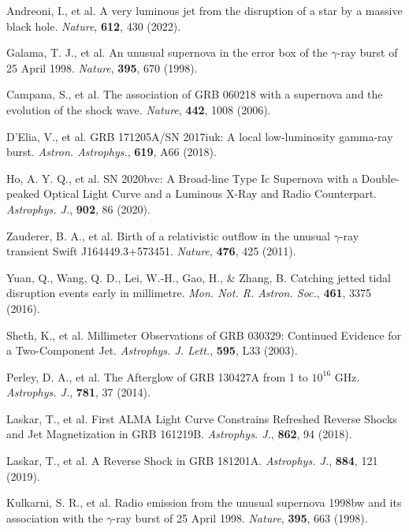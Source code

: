 \documentclass{nature_plusfigure}
\newcommand{\mn}{{Mon. Not. R. Astron. Soc.}}
\newcommand{\mnras}{\mn}
\newcommand{\apj}{{Astrophys. J.}}
\newcommand{\apjl}{{Astrophys. J. Lett.}}
\newcommand{\aap}{{Astron. Astrophys.}}
\newcommand{\nat}{{Nature}}
\begin{document}
\begin{methods}
\begin{thebibliography}{10}
 Andreoni, I., et al. A very luminous jet from the disruption of a star by a massive black hole. \emph{\nat}, \textbf{612}, 430 (2022). 

 Galama, T. J., et al. An unusual supernova in the error box of the $\gamma$-ray burst of 25 April 1998. \emph{\nat}, \textbf{395}, 670 (1998). 

 Campana, S., et al. The association of GRB 060218 with a supernova and the evolution of the shock wave. \emph{\nat}, \textbf{442}, 1008 (2006). 

 D'Elia, V., et al. GRB 171205A/SN 2017iuk: A local low-luminosity gamma-ray burst. \emph{\aap}, \textbf{619}, A66 (2018). 

 Ho, A. Y. Q., et al. SN 2020bvc: A Broad-line Type Ic Supernova with a Double-peaked Optical Light Curve and a Luminous X-Ray and Radio Counterpart. \emph{\apj}, \textbf{902}, 86 (2020). 



 Zauderer, B. A., et al. Birth of a relativistic outflow in the unusual $\gamma$-ray transient Swift J164449.3+573451. \emph{\nat}, \textbf{476}, 425 (2011). 

 Yuan, Q., Wang, Q. D., Lei, W.-H., Gao, H., \& Zhang, B. Catching jetted tidal disruption events early in millimetre. \emph{\mnras}, \textbf{461}, 3375 (2016). 

 Sheth, K., et al. Millimeter Observations of GRB 030329: Continued Evidence for a Two-Component Jet. \emph{\apjl}, \textbf{595}, L33 (2003). 

 Perley, D. A., et al. The Afterglow of GRB 130427A from 1 to $10^{16}$ GHz. \emph{\apj}, \textbf{781}, 37 (2014). 

 Laskar, T., et al. First ALMA Light Curve Constrains Refreshed Reverse Shocks and Jet Magnetization in GRB 161219B. \emph{\apj}, \textbf{862}, 94 (2018). 

 Laskar, T., et al. A Reverse Shock in GRB 181201A. \emph{\apj}, \textbf{884}, 121 (2019). 

 Kulkarni, S. R., et al. Radio emission from the unusual supernova 1998bw and its association with the $\gamma$-ray burst of 25 April 1998. \emph{\nat}, \textbf{395}, 663 (1998). 


\end{thebibliography}
\end{methods}
\end{document}

